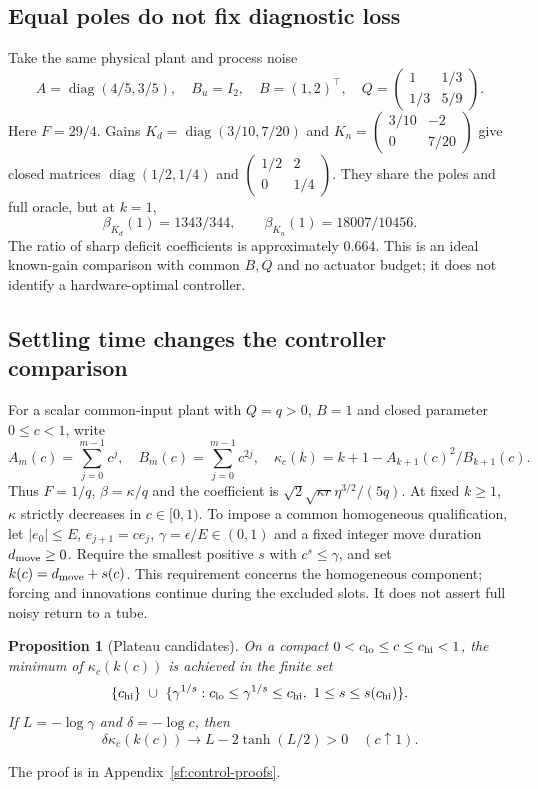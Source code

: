 \documentclass[journal]{IEEEtran}
\newtheorem{proposition}{Proposition}
\begin{document}
\subsection{Equal poles do not fix diagnostic loss}
Take the same physical plant and process noise
\[
A=\operatorname{diag}(4/5,3/5),\quad B_u=I_2,\quad B=(1,2)^\top,
\quad Q=\begin{pmatrix}1&1/3\\1/3&5/9\end{pmatrix}.
\]
Here $F=29/4$. Gains
$K_d=\operatorname{diag}(3/10,7/20)$ and
$K_n=\left(\begin{smallmatrix}3/10&-2\\0&7/20\end{smallmatrix}\right)$
give closed matrices $\operatorname{diag}(1/2,1/4)$ and
$\left(\begin{smallmatrix}1/2&2\\0&1/4\end{smallmatrix}\right)$.
They share the poles and full oracle, but at $k=1$,
\[
\beta_{K_d}(1)=1343/344,\qquad \beta_{K_n}(1)=18007/10456.
\]
The ratio of sharp deficit coefficients is approximately $0.664$.
This is an ideal known-gain comparison with common $B,Q$ and no actuator
budget; it does not identify a hardware-optimal controller.

\subsection{Settling time changes the controller comparison}
For a scalar common-input plant with $Q=q>0$, $B=1$ and closed parameter
$0\le c<1$, write
\[
A_m(c)=\sum_{j=0}^{m-1}c^j,\quad B_m(c)=\sum_{j=0}^{m-1}c^{2j},
\quad \kappa_c(k)=k+1-A_{k+1}(c)^2/B_{k+1}(c).
\]
Thus $F=1/q$, $\beta=\kappa/q$ and the coefficient is
$\sqrt{2}\sqrt{\kappa r}\eta^{3/2}/(5q)$.
At fixed $k\ge1$, $\kappa$ strictly decreases in $c\in[0,1)$.
To impose a common homogeneous qualification, let $|e_0|\le E$,
$e_{j+1}=ce_j$, $\gamma=\epsilon/E\in(0,1)$ and a fixed integer
move duration $d_{\rm move}\ge0$. Require the smallest positive $s$ with
$c^s\le\gamma$, and set $k(c)=d_{\rm move}+s(c)$.
This requirement concerns the homogeneous component; forcing and innovations
continue during the excluded slots. It does not assert full noisy return to a tube.

\begin{proposition}[Plateau candidates]\label{sf:settling}
On a compact $0<c_{\rm lo}\le c\le c_{\rm hi}<1$, the minimum of
$\kappa_c(k(c))$ is achieved in the finite set
\[
\{c_{\rm hi}\}\ \cup\
\{\gamma^{1/s}:c_{\rm lo}\le\gamma^{1/s}\le c_{\rm hi},
\ 1\le s\le s(c_{\rm hi})\}.
\]
If $L=-\log\gamma$ and $\delta=-\log c$, then
\[
\delta\kappa_c(k(c))\longrightarrow L-2\tanh(L/2)>0
\quad(c\uparrow1).
\]
\end{proposition}
The proof is in Appendix~\ref{sf:control-proofs}.
\end{document}
